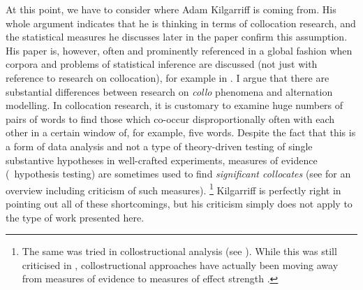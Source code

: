 At this point, we have to consider where Adam Kilgarriff is coming from.
His whole argument indicates that he is thinking in terms of collocation research, and the statistical measures he discusses later in the paper confirm this assumption.
His paper is, however, often and prominently referenced in a global fashion when corpora and problems of statistical inference are discussed (not just with reference to research on collocation), for example in \citet[2]{DivjakEa2016a}.
I argue that there are substantial differences between research on \textit{collo} phenomena and alternation modelling.
In collocation research, it is customary to examine huge numbers of pairs of words to find those which co-occur disproportionally often with each other in a certain window of, for example, five words.
Despite the fact that this is a form of data analysis and not a type of theory-driven testing of single substantive hypotheses in well-crafted experiments, measures of evidence (\ie\ hypothesis testing) are sometimes used to find \textit{significant collocates} (see \citealt{Evert2008} for an overview including criticism of such measures).%
\footnote{The same was tried in collostructional analysis (see \citealt{StefanowitschGries2003,GriesStefanowitsch2004}).
While this was still criticised in \citet{SchmidKuechenhoff2013,KuechenhoffSchmid2015}, collostructional approaches have actually been moving away from measures of evidence to measures of effect strength \citet{Gries2012a,Gries2015b}.}
Kilgarriff is perfectly right in pointing out all of these shortcomings, but his criticism simply does not apply to the type of work presented here.


